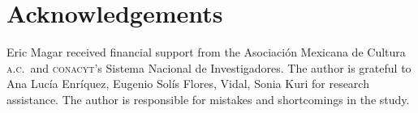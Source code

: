 \documentclass[letter,12pt]{article}
\begin{document}
\newpage

\section*{Acknowledgements}
Eric Magar received financial support from the Asociaci\'on Mexicana de Cultura \textsc{a.c.}\ and \textsc{conacyt}'s Sistema Nacional de Investigadores. The author is grateful to Ana Lucía Enríquez, Eugenio Solís Flores, Vidal, Sonia Kuri for research assistance. The author is responsible for mistakes and shortcomings in the study.









\end{document}
